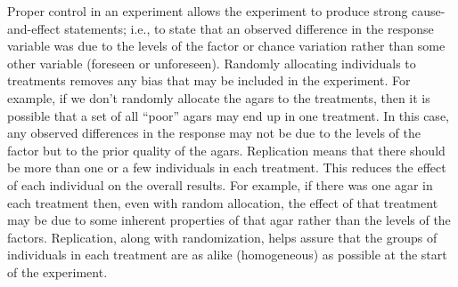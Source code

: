 \documentclass[10pt,openany]{book}\usepackage[]{graphicx}\usepackage[]{color}
\begin{document}
Proper control in an experiment allows the experiment to produce strong cause-and-effect statements; i.e., to state that an observed difference in the response variable was due to the levels of the factor or chance variation rather than some other variable (foreseen or unforeseen).  Randomly allocating individuals to treatments removes any bias that may be included in the experiment.  For example, if we don't randomly allocate the agars to the treatments, then it is possible that a set of all ``poor'' agars may end up in one treatment.  In this case, any observed differences in the response may not be due to the levels of the factor but to the prior quality of the agars.  Replication means that there should be more than one or a few individuals in each treatment.  This reduces the effect of each individual on the overall results.  For example, if there was one agar in each treatment then, even with random allocation, the effect of that treatment may be due to some inherent properties of that agar rather than the levels of the factors.  Replication, along with randomization, helps assure that the groups of individuals in each treatment are as alike (homogeneous) as possible at the start of the experiment.

\end{document}
